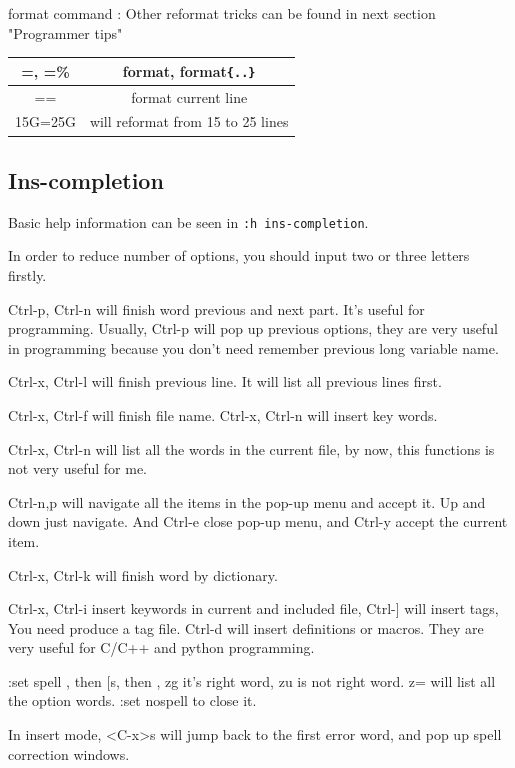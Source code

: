 \documentclass[paper=8.5in:11in, twoside, 12pt, pagesize=pdftex]{book}
\begin{document}
		format command : Other reformat tricks can be found in next section "Programmer tips" 
		\begin{center}
			\begin{tabular}{c|c}
				\hline 
				=, =\% & format, format\verb={..}=\\
				
				\hline
				== & format current line \\ 
				\hline 
				15G=25G & will reformat from 15 to 25 lines
				
			\end{tabular}
		\end{center}

	
\subsection{Ins-completion}

	Basic help information can be seen in \texttt{:h ins-completion}. 
		
	In order to reduce number of options, you should input two or three letters firstly.
		
	Ctrl-p, Ctrl-n will finish word previous and next part. It's useful for programming. Usually, Ctrl-p will pop up previous options, they are very useful in programming because you don't need remember previous long variable name. 
		
	Ctrl-x, Ctrl-l will finish previous line. It will list all previous lines first. 
		
	Ctrl-x, Ctrl-f will finish file name. Ctrl-x, Ctrl-n will insert key words.
		
	Ctrl-x, Ctrl-n will list all the words in the current file, by now, this functions is not very useful for me. 
		
	Ctrl-n,p will navigate all the items in the pop-up menu and accept it. Up and down just navigate. And Ctrl-e close pop-up menu, and Ctrl-y accept the current item. 
		
	Ctrl-x, Ctrl-k will finish word by dictionary. 
		
	Ctrl-x, Ctrl-i insert keywords in current and included file,  Ctrl-] will insert tags, You need produce a tag file. Ctrl-d will insert definitions or macros. They are very useful for C/C++ and python programming.
		
	:set spell , then $[$s, then , zg it's right word,  zu is not right word. z= will list all the option words. :set nospell to close it.
		
	In insert mode, <C-x>s will jump back to the first error word, and pop up spell correction windows. 
\end{document}
